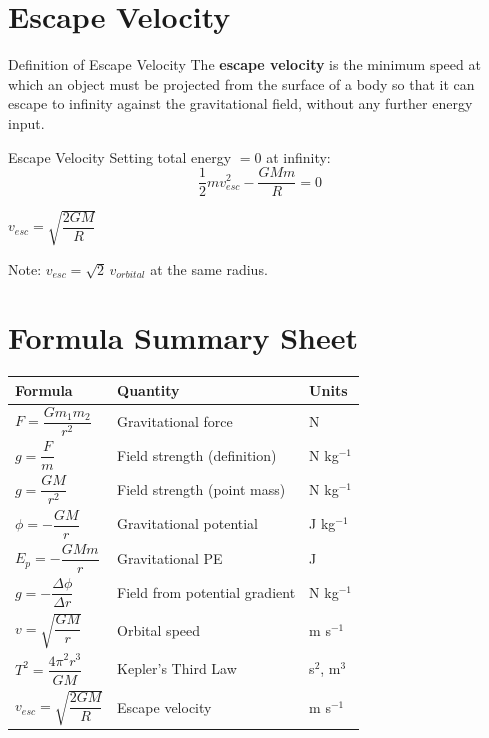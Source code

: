 \documentclass[12pt,a4paper]{article}
\begin{document}
\section{Escape Velocity}

\begin{definitionbox}{Definition of Escape Velocity}
The \textbf{escape velocity} is the minimum speed at which an object must be projected from the surface of a body so that it can escape to infinity against the gravitational field, without any further energy input.
\end{definitionbox}

\begin{formulabox}{Escape Velocity}
Setting total energy $= 0$ at infinity:
$$\frac{1}{2}mv_{esc}^2 - \frac{GMm}{R} = 0$$
\begin{center}
\Large $v_{esc} = \sqrt{\dfrac{2GM}{R}}$
\end{center}
\vspace{0.3em}
Note: $v_{esc} = \sqrt{2}\, v_{orbital}$ at the same radius.
\end{formulabox}

\section{Formula Summary Sheet}

\begin{tcolorbox}[colback=lightgold, colframe=accentgold, breakable]
\renewcommand{\arraystretch}{1.8}
\begin{tabular}{@{}lll@{}}
\toprule
\textbf{Formula} & \textbf{Quantity} & \textbf{Units} \\
\midrule
$F = \dfrac{Gm_1 m_2}{r^2}$ & Gravitational force & N \\
$g = \dfrac{F}{m}$ & Field strength (definition) & N kg$^{-1}$ \\
$g = \dfrac{GM}{r^2}$ & Field strength (point mass) & N kg$^{-1}$ \\
$\phi = -\dfrac{GM}{r}$ & Gravitational potential & J kg$^{-1}$ \\
$E_p = -\dfrac{GMm}{r}$ & Gravitational PE & J \\
$g = -\dfrac{\Delta\phi}{\Delta r}$ & Field from potential gradient & N kg$^{-1}$ \\
$v = \sqrt{\dfrac{GM}{r}}$ & Orbital speed & m s$^{-1}$ \\
$T^2 = \dfrac{4\pi^2 r^3}{GM}$ & Kepler's Third Law & s$^2$, m$^3$ \\
$v_{esc} = \sqrt{\dfrac{2GM}{R}}$ & Escape velocity & m s$^{-1}$ \\
\bottomrule
\end{tabular}
\end{tcolorbox}
\end{document}
